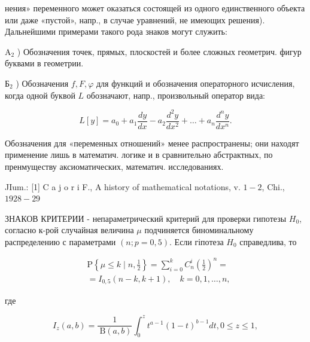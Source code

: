\documentclass[10pt]{article}
\begin{document}
нения» переменного может оказаться состоящей из одного единственного объекта или даже «пустой», напр., в случае уравнений, не имеющих решения). Дальнейшими примерами такого рода знаков могут служить:



$\mathrm{A}_{2}$ ) Обозначения точек, прямых, плоскостей и более сложных геометрич. фигур буквами в геометрии.



$\mathrm{Б}_{2}$ ) Обозначения $f, F, \varphi$ для функций и обозначения операторного исчисления, когда одной буквой $L$ обозначают, напр., произвольный оператор вида:



\[

L[y]=a_{0}+a_{1} \frac{d y}{d x}-a_{2} \frac{d^{2} y}{d x^{2}}+\ldots+a_{n} \frac{d^{n} y}{d x^{n}} .

\]



Обозначения для «переменных отношений» менее распространены; они находят применение лишь в математич. логике и в сравнительно абстрактных, по пренмуществу аксиоматических, математич. исследованиях.



JIum.: [1] C a j o r i F., A history of mathematical notations, v. $1-2$, Chi., $1928-29$



ЗНАКОВ КРИТЕРИИ - непараметрический критерий для проверки гипотезы $H_{0}$, согласно к-рой случайная величина $\mu$ подчиняется биноминальному распределению с параметрами $(n ; p=0,5)$. Если гіпотеза $H_{0}$ справедлива, то



\[

\begin{aligned}

& \mathrm{P}\left\{\mu \leqslant k \mid n, \frac{1}{2}\right\}=\sum_{i=0}^{k} C_{n}^{i}\left(\frac{1}{2}\right)^{n}= \\

& =I_{0,5}(n-k, k+1), \quad k=0,1, \ldots, n,

\end{aligned}

\]



где



\[

I_{z}(a, b)=\frac{1}{\mathrm{~B}(a, b)} \int_{0}^{z} t^{a-1}(1-t)^{b-1} d t, 0 \leqslant z \leqslant 1,

\]
\end{document}

